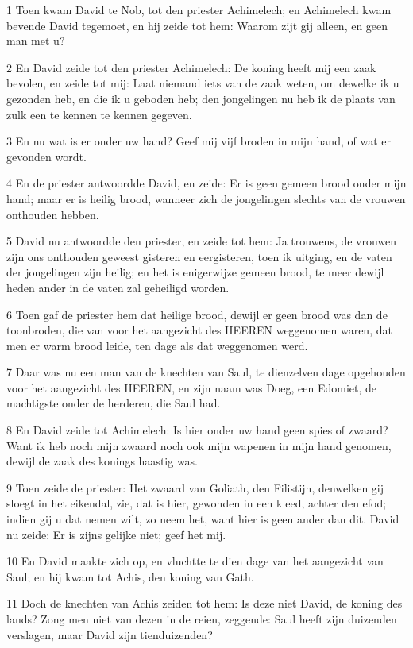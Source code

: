 \par 1 Toen kwam David te Nob, tot den priester Achimelech; en Achimelech kwam bevende David tegemoet, en hij zeide tot hem: Waarom zijt gij alleen, en geen man met u?
\par 2 En David zeide tot den priester Achimelech: De koning heeft mij een zaak bevolen, en zeide tot mij: Laat niemand iets van de zaak weten, om dewelke ik u gezonden heb, en die ik u geboden heb; den jongelingen nu heb ik de plaats van zulk een te kennen te kennen gegeven.
\par 3 En nu wat is er onder uw hand? Geef mij vijf broden in mijn hand, of wat er gevonden wordt.
\par 4 En de priester antwoordde David, en zeide: Er is geen gemeen brood onder mijn hand; maar er is heilig brood, wanneer zich de jongelingen slechts van de vrouwen onthouden hebben.
\par 5 David nu antwoordde den priester, en zeide tot hem: Ja trouwens, de vrouwen zijn ons onthouden geweest gisteren en eergisteren, toen ik uitging, en de vaten der jongelingen zijn heilig; en het is enigerwijze gemeen brood, te meer dewijl heden ander in de vaten zal geheiligd worden.
\par 6 Toen gaf de priester hem dat heilige brood, dewijl er geen brood was dan de toonbroden, die van voor het aangezicht des HEEREN weggenomen waren, dat men er warm brood leide, ten dage als dat weggenomen werd.
\par 7 Daar was nu een man van de knechten van Saul, te dienzelven dage opgehouden voor het aangezicht des HEEREN, en zijn naam was Doeg, een Edomiet, de machtigste onder de herderen, die Saul had.
\par 8 En David zeide tot Achimelech: Is hier onder uw hand geen spies of zwaard? Want ik heb noch mijn zwaard noch ook mijn wapenen in mijn hand genomen, dewijl de zaak des konings haastig was.
\par 9 Toen zeide de priester: Het zwaard van Goliath, den Filistijn, denwelken gij sloegt in het eikendal, zie, dat is hier, gewonden in een kleed, achter den efod; indien gij u dat nemen wilt, zo neem het, want hier is geen ander dan dit. David nu zeide: Er is zijns gelijke niet; geef het mij.
\par 10 En David maakte zich op, en vluchtte te dien dage van het aangezicht van Saul; en hij kwam tot Achis, den koning van Gath.
\par 11 Doch de knechten van Achis zeiden tot hem: Is deze niet David, de koning des lands? Zong men niet van dezen in de reien, zeggende: Saul heeft zijn duizenden verslagen, maar David zijn tienduizenden?
